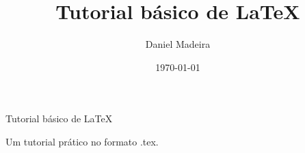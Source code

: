 \documentclass[a4paper,12pt,oneside]{book}
\title{Tutorial básico de \LaTeX} %
\author{Daniel Madeira} %
\date{\today} %
\newenvironment{folharosto}[1]
	{\begin{center}
		\vspace*{\fill}
		{\LARGE #1}\par
		\vspace{2cm}
    }
    {
		\vspace*{\fill}
		\thispagestyle{empty}
		\renewcommand{\thepage}{rosto}
    \end{center}
    }
\begin{document}
\begin{titlepage}
    \maketitle
    \thispagestyle{fancy}
    \renewcommand{\thepage}{capa}
\end{titlepage}

\pagecolor{gray!5!yellow!5}

\begin{folharosto}{Tutorial básico de \LaTeX}
	Um tutorial prático no formato .tex.
\end{folharosto}

\frontmatter
\end{document}
